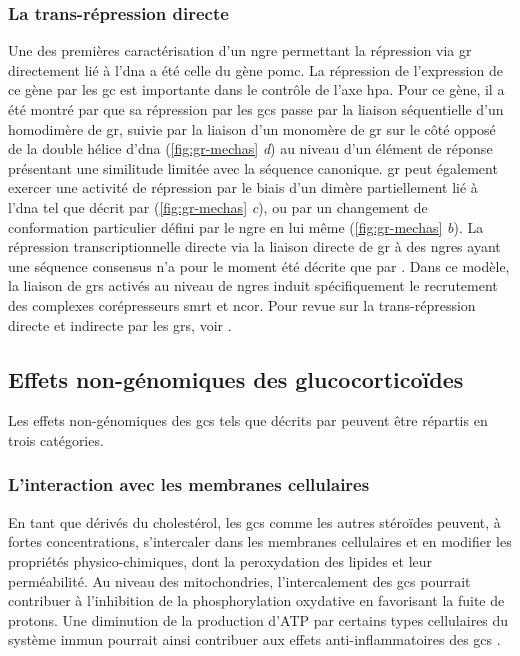 \documentclass[../main.tex]{subfiles}
\begin{document}
		\subsubsection{La trans-répression directe}
			Une des premières caractérisation d'un \gls{ngre} permettant la répression via \gls{gr} directement lié à l'\gls{dna} a été celle du gène \gls{pomc}.
			La répression de l'expression de ce gène par les \gls{gc} est importante dans le contrôle de l'axe \gls{hpa}.
			Pour ce gène, il a été montré par \citet{Drouin1993} que sa répression par les \glspl{gc} passe par la liaison séquentielle d'un homodimère de \gls{gr}, suivie par la liaison d'un monomère de \gls{gr} sur le côté opposé de la double hélice d'\gls{dna} (\autoref{fig:gr-mechas} \textit{d}) au niveau d'un élément de réponse présentant une similitude limitée avec la séquence canonique.
			\gls{gr} peut également exercer une activité de répression par le biais d'un dimère partiellement lié à l'\gls{dna} tel que décrit par \citet{Lefstin1998} (\autoref{fig:gr-mechas} \textit{c}), ou par un changement de conformation particulier défini par le \gls{ngre} en lui même (\autoref{fig:gr-mechas} \textit{b}).
			La répression transcriptionnelle directe via la liaison directe de \gls{gr} à des \glspl{ngre} ayant une séquence consensus n'a pour le moment été décrite que par \citet{Surjit2011}.
			Dans ce modèle, la liaison de \glspl{gr} activés au niveau de \glspl{ngre} induit spécifiquement le recrutement des complexes corépresseurs \gls{smrt} et \gls{ncor}.
			Pour revue sur la trans-répression directe et indirecte par les \glspl{gr}, voir \citet{Dostert2004}.

	\subsection{Effets non-génomiques des glucocorticoïdes}
	Les effets non-génomiques des \glspl{gc} tels que décrits par \citet{Stahn2008a} peuvent être répartis en trois catégories.

		\subsubsection{L'interaction avec les membranes cellulaires}
			En tant que dérivés du cholestérol, les \glspl{gc} comme les autres stéroïdes peuvent, à fortes concentrations, s'intercaler dans les membranes cellulaires et en modifier les propriétés physico-chimiques, dont la peroxydation des lipides et leur perméabilité.
			Au niveau des mitochondries, l'intercalement des \glspl{gc} pourrait contribuer à l'inhibition de la phosphorylation oxydative en favorisant la fuite de protons.
			Une diminution de la production d'ATP par certains types cellulaires du système immun pourrait ainsi contribuer aux effets anti-inflammatoires des \glspl{gc} \citep{Buttgereit2002}.
\end{document}
